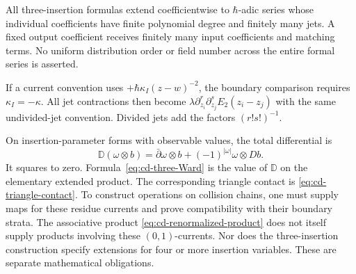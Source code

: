 All three-insertion formulas extend coefficientwise to $\hbar$-adic series
whose individual coefficients have finite polynomial degree and finitely
many jets.  A fixed output coefficient receives finitely many input
coefficients and matching terms.  No uniform distribution order or field
number across the entire formal series is asserted.

If a current convention uses $+\hbar\kappa_I(z-w)^{-2}$, the boundary
comparison requires $\kappa_I=-\kappa$.
All jet contractions then become
$\lambda\partial_{z_i}^r\partial_{z_j}^sE_2(z_i-z_j)$ with the same
undivided-jet convention.  Divided jets add the factors $(r!s!)^{-1}$.

On insertion-parameter forms with observable values, the total differential is
\[
 \mathbb D(\omega\otimes b)
 =\bar\partial\omega\otimes b+(-1)^{|\omega|}\omega\otimes Db.
\]
It squares to zero.  Formula~\eqref{eq:cd-three-Ward} is the value of
$\mathbb D$ on the elementary extended product.
The corresponding triangle contact is \eqref{eq:cd-triangle-contact}.
To construct operations on collision chains, one must supply maps for
these residue currents and prove compatibility with their boundary strata.
The associative product \eqref{eq:cd-renormalized-product} does not itself
supply products involving these $(0,1)$-currents.
Nor does the three-insertion construction specify extensions for four or
more insertion variables.  These are separate mathematical obligations.
